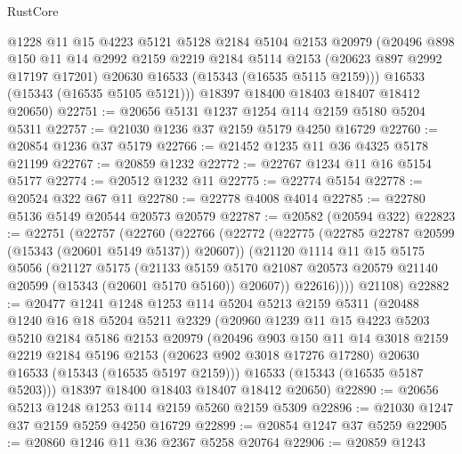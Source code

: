 \begin{lexlean}{RustCore}
\begin{coremodule}
        @1228
        @11
        @15
        @4223
        @5121
        @5128
        @2184
        @5104
        @2153
        @20979
        (@20496
          @898
          @150
          @11
          @14
          @2992
          @2159
          @2219
          @2184
          @5114
          @2153
          (@20623 @897 @2992 @17197 @17201)
          @20630
          @16533
          (@15343 (@16535 @5115 @2159)))
        @16533
        (@15343 (@16535 @5105 @5121)))
      @18397
      @18400
      @18403
      @18407
      @18412
      @20650)
@22751 := @20656 @5131 @1237 @1254 @114 @2159 @5180 @5204 @5311
@22757 := @21030 @1236 @37 @2159 @5179 @4250 @16729
@22760 := @20854 @1236 @37 @5179
@22766 := @21452 @1235 @11 @36 @4325 @5178 @21199
@22767 := @20859 @1232
@22772 := @22767 @1234 @11 @16 @5154 @5177
@22774 := @20512 @1232 @11
@22775 := @22774 @5154
@22778 := @20524 @322 @67 @11
@22780 := @22778 @4008 @4014
@22785 := @22780 @5136 @5149 @20544 @20573 @20579
@22787 := @20582 (@20594 @322)
@22823 := @22751
    (@22757
      (@22760
        (@22766
          (@22772
            (@22775 (@22785 @22787 @20599 (@15343 (@20601 @5149 @5137)) @20607))
            (@21120
              @1114
              @11
              @15
              @5175
              @5056
              (@21127
                @5175
                (@21133
                  @5159
                  @5170
                  @21087
                  @20573
                  @20579
                  @21140
                  @20599
                  (@15343 (@20601 @5170 @5160))
                  @20607))
              @22616))))
      @21108)
@22882 := @20477
    @1241
    @1248
    @1253
    @114
    @5204
    @5213
    @2159
    @5311
    (@20488
      @1240
      @16
      @18
      @5204
      @5211
      @2329
      (@20960
        @1239
        @11
        @15
        @4223
        @5203
        @5210
        @2184
        @5186
        @2153
        @20979
        (@20496
          @903
          @150
          @11
          @14
          @3018
          @2159
          @2219
          @2184
          @5196
          @2153
          (@20623 @902 @3018 @17276 @17280)
          @20630
          @16533
          (@15343 (@16535 @5197 @2159)))
        @16533
        (@15343 (@16535 @5187 @5203)))
      @18397
      @18400
      @18403
      @18407
      @18412
      @20650)
@22890 := @20656 @5213 @1248 @1253 @114 @2159 @5260 @2159 @5309
@22896 := @21030 @1247 @37 @2159 @5259 @4250 @16729
@22899 := @20854 @1247 @37 @5259
@22905 := @20860 @1246 @11 @36 @2367 @5258 @20764
@22906 := @20859 @1243

\end{coremodule}
\end{lexlean}
